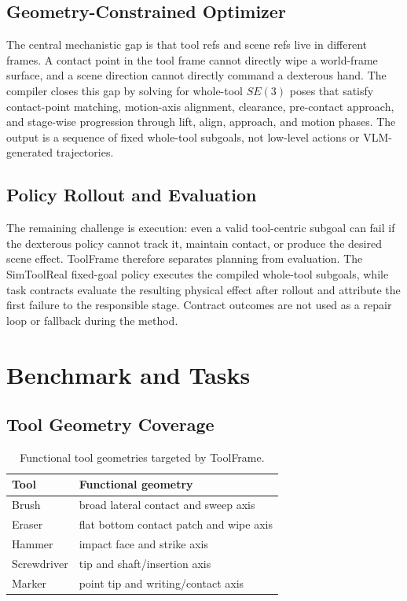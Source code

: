 \documentclass[journal]{IEEEtran}
\newcommand{\method}{ToolFrame}
\begin{document}
\subsection{Geometry-Constrained Optimizer}
The central mechanistic gap is that tool refs and scene refs live in different
frames. A contact point in the tool frame cannot directly wipe a world-frame
surface, and a scene direction cannot directly command a dexterous hand. The
compiler closes this gap by solving for whole-tool $SE(3)$ poses that satisfy
contact-point matching, motion-axis alignment, clearance, pre-contact approach,
and stage-wise progression through lift, align, approach, and motion phases.
The output is a sequence of fixed whole-tool subgoals, not low-level actions or
VLM-generated trajectories.

\subsection{Policy Rollout and Evaluation}
The remaining challenge is execution: even a valid tool-centric subgoal can
fail if the dexterous policy cannot track it, maintain contact, or produce the
desired scene effect. \method{} therefore separates planning from evaluation.
The SimToolReal fixed-goal policy executes the compiled whole-tool subgoals,
while task contracts evaluate the resulting physical effect after rollout and
attribute the first failure to the responsible stage. Contract outcomes are not
used as a repair loop or fallback during the method.

\section{Benchmark and Tasks}
\subsection{Tool Geometry Coverage}
\begin{table}[t]
\centering
\caption{Functional tool geometries targeted by \method{}.}
\begin{tabular}{ll}
\toprule
Tool & Functional geometry \\
\midrule
Brush & broad lateral contact and sweep axis \\
Eraser & flat bottom contact patch and wipe axis \\
Hammer & impact face and strike axis \\
Screwdriver & tip and shaft/insertion axis \\
Marker & point tip and writing/contact axis \\
\bottomrule
\end{tabular}
\label{tab:tools}
\end{table}
\end{document}
